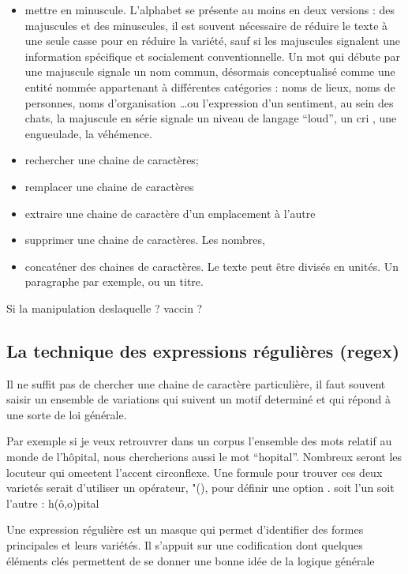 \documentclass[
]{book}
\providecommand{\tightlist}{%
  \setlength{\itemsep}{0pt}\setlength{\parskip}{0pt}}
\begin{document}
\begin{itemize}
\tightlist
\item
  mettre en minuscule. L'alphabet se présente au moins en deux versions : des majuscules et des minuscules, il est souvent nécessaire de réduire le texte à une seule casse pour en réduire la variété, sauf si les majuscules signalent une information spécifique et socialement conventionnelle. Un mot qui débute par une majuscule signale un nom commun, désormais conceptualisé comme une entité nommée appartenant à différentes catégories : noms de lieux, noms de personnes, noms d'organisation \ldots ou l'expression d'un sentiment, au sein des chats, la majuscule en série signale un niveau de langage ``loud'', un cri , une engueulade, la véhémence.\\
\item
  rechercher une chaine de caractères;
\item
  remplacer une chaine de caractères
\item
  extraire une chaine de caractère d'un emplacement à l'autre
\item
  supprimer une chaine de caractères. Les nombres,
\item
  concaténer des chaines de caractères. Le texte peut être divisés en unités. Un paragraphe par exemple, ou un titre.
\end{itemize}

Si la manipulation deslaquelle ? vaccin ?

\hypertarget{la-technique-des-expressions-ruxe9guliuxe8res-regex}{%
\subsection{La technique des expressions régulières (regex)}\label{la-technique-des-expressions-ruxe9guliuxe8res-regex}}

Il ne suffit pas de chercher une chaine de caractère particulière, il faut souvent saisir un ensemble de variations qui suivent un motif determiné et qui répond à une sorte de loi générale.

Par exemple si je veux retrouvrer dans un corpus l'ensemble des mots relatif au monde de l'hôpital, nous chercherions aussi le mot ``hopital''. Nombreux seront les locuteur qui omeetent l'accent circonflexe. Une formule pour trouver ces deux varietés serait d'utiliser un opérateur, "(), pour définir une option . soit l'un soit l'autre :
h(ô,o)pital

Une expression régulière est un masque qui permet d'identifier des formes principales et leurs variétés. Il s'appuit sur une codification dont quelques éléments clés permettent de se donner une bonne idée de la logique générale
\end{document}
